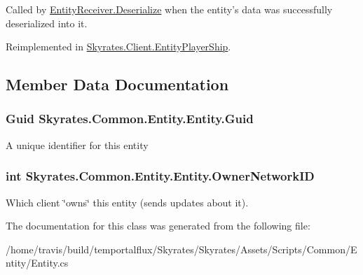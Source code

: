 Called by \hyperlink{class_skyrates_1_1_common_1_1_entity_1_1_entity_receiver_a9da0b7c3a8b9e1ed7d10be74ce80482b}{Entity\-Receiver.\-Deserialize} when the entity's data was successfully deserialized into it. 



Reimplemented in \hyperlink{class_skyrates_1_1_client_1_1_entity_player_ship_ab7106388ce039e10be38c27906372312}{Skyrates.\-Client.\-Entity\-Player\-Ship}.



\subsection{Member Data Documentation}
\hypertarget{class_skyrates_1_1_common_1_1_entity_1_1_entity_ae32af79e6a33bed16aeb0455078885c8}{
\subsubsection[{Guid}]{\setlength{\rightskip}{0pt plus 5cm}Guid Skyrates.\-Common.\-Entity.\-Entity.\-Guid}}\label{class_skyrates_1_1_common_1_1_entity_1_1_entity_ae32af79e6a33bed16aeb0455078885c8}


A unique identifier for this entity 

\hypertarget{class_skyrates_1_1_common_1_1_entity_1_1_entity_a855cbcf588c2b4c490c2ddc157e11029}{
\subsubsection[{Owner\-Network\-I\-D}]{\setlength{\rightskip}{0pt plus 5cm}int Skyrates.\-Common.\-Entity.\-Entity.\-Owner\-Network\-I\-D}}\label{class_skyrates_1_1_common_1_1_entity_1_1_entity_a855cbcf588c2b4c490c2ddc157e11029}


Which client \char`\"{}owns\char`\"{} this entity (sends updates about it). 



The documentation for this class was generated from the following file\-:\begin{DoxyCompactItemize}
\item 
/home/travis/build/temportalflux/\-Skyrates/\-Skyrates/\-Assets/\-Scripts/\-Common/\-Entity/Entity.\-cs\end{DoxyCompactItemize}
